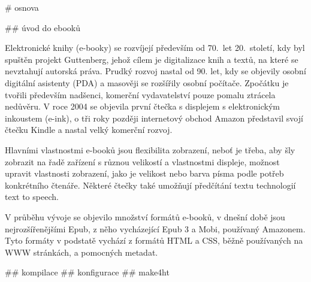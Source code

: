 # osnova

## úvod do ebooků


Elektronické knihy (e-booky) se rozvíjejí především od 70.~let 20.~století, kdy
byl spuštěn projekt Guttenberg, jehož cílem je digitalizace knih a textů, na
které se nevztahují autorská práva. Prudký rozvoj nastal od 90. let, kdy se
objevily osobní digitální asistenty (PDA) a masověji se rozšířily osobní
počítače. Zpočátku je tvořili především nadšenci, komerční vydavatelství pouze
pomalu ztrácela nedůvěru. V roce 2004 se objevila první čtečka s displejem s
elektronickým inkoustem (e-ink), o tři roky později internetový obchod Amazon
představil svojí čtečku Kindle a nastal velký komerční rozvoj.

Hlavními vlastnostmi e-booků jsou flexibilita zobrazení, neboť je třeba, aby
šly zobrazit na řadě zařízení s různou velikostí a vlastnostmi displeje,
možnost upravit vlastnosti zobrazení, jako je velikost nebo barva písma podle
potřeb konkrétního čtenáře. Některé čtečky také umožňují předčítání textu
technologií text to speech.

V průběhu vývoje se objevilo množství formátů e-booků, v dnešní době jsou
nejrozšířenějšími Epub, z něho vycházející Epub 3 a Mobi, používaný Amazonem.
Tyto formáty v podstatě vychází z formátů HTML a CSS, běžně používaných na WWW
stránkách, a pomocných metadat. 





## kompilace
## konfigurace
## make4ht
